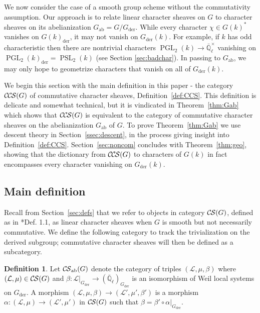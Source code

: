 \documentclass[10pt]{amsart}
\theoremstyle{plain}
\theoremstyle{definition}
\newtheorem{definition}[theorem]{Definition}
\newcommand{\EE}{\mathbb{\bar Q}_\ell}
\newcommand{\EEx}{\EE^\times}
\DeclareMathOperator{\PGL}{PGL}
\DeclareMathOperator{\PSL}{PSL}
\newcommand{\der}{_{\operatorname{der}}}
\newcommand{\ab}{_{\operatorname{ab}}}
\newcommand{\cs}[1]{{\mathcal{#1}}}
\newcommand{\CS}{{\mathcal{C\hskip-0.8pt S}}}
\newcommand{\CCS}{{\mathcal{C\hskip-.8pt C\hskip-0.8pt S}}}
\begin{document}
We now consider the case of a smooth group scheme without the commutativity assumption.  Our approach
is to relate linear character sheaves on $G$ to character sheaves on its abelianization $G\ab = G / G\der$.
While every character $\chi \in G(k)^*$ vanishes on $G(k)\der$, it may not vanish on $G\der(k)$.  For example,
if $k$ has odd characteristic then there are nontrivial characters $\PGL_2(k) \to \EEx$ vanishing on
$\PGL_2(k)\der = \PSL_2(k)$ (see Section \ref{sec:badchar}).  In passing to $G\ab$,
we may only hope to geometrize characters that vanish on all of $G\der(k)$.

We begin this section with the main definition in this paper - the category $\CCS(G)$ of commutative character sheaves, Definition~\ref{def:CCS}. 
This definition is delicate and somewhat technical, but it is vindicated in Theorem~\ref{thm:Gab} which shows that $\CCS(G)$ is equivalent to the category of commutative character sheaves on the abelianization $G\ab$ of $G$. 
To prove Theorem~\ref{thm:Gab} we use descent theory in Section~\ref{ssec:descent}, in the process giving insight into Definition~\ref{def:CCS}. 
Section~\ref{sec:noncom} concludes with Theorem~\ref{thm:geo}, showing that the dictionary from $\CCS(G)$
to characters of $G(k)$ in fact encompasses every character vanishing on $G\der(k)$.

\subsection{Main definition}\label{ssec:noncomdef}

Recall from Section~\ref{sec:defs} that we refer to objects in category $\CS(G)$, defined as
in \cite{cunningham-roe:13a}*{Def. 1.1}, as linear character sheaves when $G$ is smooth but
not necessarily commutative.  
We define the following category to track the trivialization on the derived subgroup;
commutative character sheaves will then be defined as a subcategory.


\begin{definition}\label{def:CSab}
Let $\CS\ab(G)$ denote the category of triples $(\cs{L},\mu,\beta)$ where $(\cs{L},\mu) \in \CS(G)$ and
$\beta : \cs{L}\vert_{G\der} \to (\EE)_{G\der}$ is an isomorphism of Weil local systems on $G\der$.
A morphism $(\cs{L},\mu,\beta)\to (\cs{L}',\mu',\beta')$ is a morphism $\alpha : (\cs{L},\mu)\to (\cs{L}',\mu')$
in $\CS(G)$ such that $\beta = \beta' \circ \alpha\vert_{G\der}$.  
\end{definition}
\end{document}
